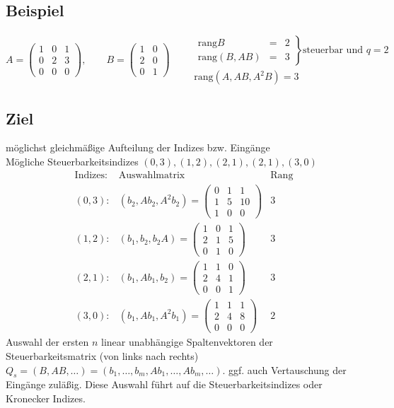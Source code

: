 \documentclass[ngerman]{tudscrreprt}
\begin{document}
\subsection*{Beispiel} \begin{equation*}
A = \begin{pmatrix}
1 & 0 & 1\\ 
0 & 2 & 3\\ 
0& 0 & 0
\end{pmatrix} , \qquad B =\begin{pmatrix} 1&0\\ 2&0\\ 0&1 \end{pmatrix} \qquad
\begin{matrix}
\left. \begin{matrix} \text{rang}B &=& 2\\ \text{rang}(B,AB) &=& 3 \end{matrix}\right\} \text{steuerbar und } q= 2 & \qquad \\ 
\text{rang}(A,AB,A^2B) = 3& 
\end{matrix}
\end{equation*}  
\subsection*{Ziel} möglichst gleichmäßige Aufteilung der Indizes bzw. Eingänge\\
Mögliche Steuerbarkeitsindizes $(0,3), (1,2), (2,1), (2,1), (3,0)$
\begin{equation*}
\begin{matrix}
\text{Indizes:}& \text{Auswahlmatrix}& \text{Rang}\\ 
(0,3):& (b_2, Ab_2, A^2b_2) = \begin{pmatrix} 0&1&1\\1&5&10\\1&0&0\end{pmatrix}& 3\\ 
(1,2):& (b_1, b_2, b_2 A) = \begin{pmatrix} 1&0&1\\2&1&5\\0&1&0\end{pmatrix}& 3\\ 
(2,1):& (b_1, Ab_1, b_2) = \begin{pmatrix} 1&1&0\\2&4&1\\0&0&1\end{pmatrix}& 3\\ 
(3,0):& (b_1, Ab_1, A^2b_1) = \begin{pmatrix} 1&1&1\\2&4&8\\0&0&0\end{pmatrix}& 2
\end{matrix}
\end{equation*}
Auswahl der ersten $n$ linear unabhängige Spaltenvektoren der Steuerbarkeitsmatrix (von links nach rechts) $Q_s = (B, AB, \dots)= (b_1,\dots, b_m, Ab_1,\dots, Ab_m,\dots).$ ggf. auch Vertauschung der Eingänge zuläßig. Diese Auswahl führt auf die Steuerbarkeitsindizes oder Kronecker Indizes.
\end{document}
